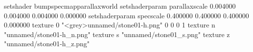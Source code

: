 setshader bumpspecmapparallaxworld
setshaderparam parallaxscale 0.004000 0.004000 0.004000 0.000000
setshaderparam specscale 0.400000 0.400000 0.400000 0.000000
texture 0 "<grey>unnamed/stone01-h.png" 0 0 0 1
texture n "unnamed/stone01-h_n.png"
texture s "unnamed/stone01_s.png"
texture z "unnamed/stone01-h_z.png"